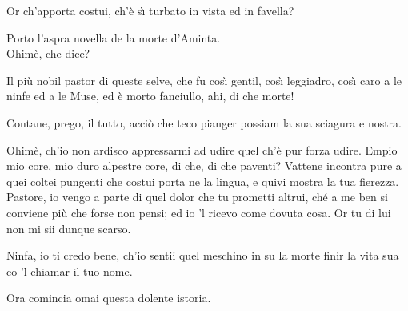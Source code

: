 \documentclass{book}
\begin{document}
	\9 Or ch'apporta costui,
	ch'\`e s\`{\i} turbato in vista ed in favella?

	 Porto l'aspra novella
	de la morte d'Aminta. \\

   \3 Ohim\`e, che dice?

	 Il pi\`u nobil pastor di queste selve,
	che fu cos\`{\i} gentil, cos\`{\i} leggiadro,
	cos\`{\i} caro a le ninfe ed a le Muse,
	ed \`e morto fanciullo, ahi, di che morte!

	\9 Contane, prego, il tutto, acci\`o che teco
	pianger possiam la sua sciagura e nostra.

	\3 Ohim\`e, ch'io non ardisco
	appressarmi ad udire
	quel ch'\`e pur forza udire. Empio mio core,
	mio duro alpestre core,
	di che, di che paventi?
	Vattene incontra pure
	a quei coltei pungenti
	che costui porta ne la lingua, e quivi
	mostra la tua fierezza.
	Pastore, io vengo a parte
	di quel dolor che tu prometti altrui,
	ch\'e a me ben si conviene
	pi\`u che forse non pensi; ed io 'l ricevo
	come dovuta cosa. Or tu di lui
	non mi sii dunque scarso.

	 Ninfa, io ti credo bene,
	ch'io sentii quel meschino in su la morte
	finir la vita sua
	co 'l chiamar il tuo nome.

	\2 Ora comincia omai
	questa dolente istoria.
\end{document}
